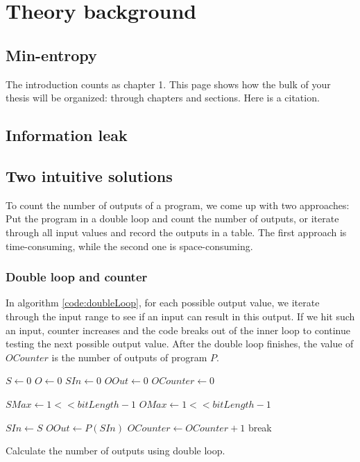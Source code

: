 \chapter{Theory background}
	\label{CH_02}

\section{Min-entropy}
The introduction counts as chapter 1.  This page shows how the bulk of your thesis will be organized: through chapters and sections. Here is a citation.\cite{OBTMBD01}

\section{Information leak}

\section{Two intuitive solutions}
To count the number of outputs of a program, we come up with two approaches: Put the program in a double loop and count the number of outputs, or iterate through all input values and record the outputs in a table. The first approach is time-consuming, while the second one is space-consuming.

\subsection{Double loop and counter}
In algorithm \ref{code:doubleLoop}, for each possible output value, we iterate through the input range to see if an input can result in this output. If we hit such an input, counter increases and the code breaks out of the inner loop to continue testing the next possible output value. After the double loop finishes, the value of $OCounter$ is the number of outputs of program $P$.

\begin{algorithm}
\begin{algorithmic}
\renewcommand{\algorithmiccomment}[1]{// #1}
\STATE $S \leftarrow 0$
\STATE $O \leftarrow 0$
\STATE $SIn \leftarrow 0$
\STATE $OOut \leftarrow 0$
\STATE $OCounter \leftarrow 0$

\STATE $SMax \leftarrow 1 << bitLength - 1$
\STATE $OMax \leftarrow 1 << bitLength - 1$

\STATE $SIn \leftarrow S$ 
\STATE $OOut \leftarrow P(SIn)$ 
\STATE $OCounter \leftarrow OCounter + 1$
\STATE break
\ENDIF
\ENDFOR
\ENDFOR
\end{algorithmic}

\caption[Double loop]{Calculate the number of outputs using double loop.}
\label{code:doubleLoop}
\end{algorithm}

